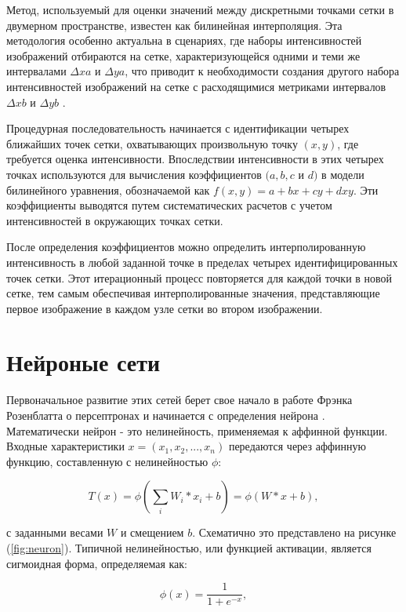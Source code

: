 Метод, используемый для оценки значений между дискретными точками сетки в двумерном пространстве, известен как билинейная интерполяция. Эта методология особенно актуальна в сценариях, где наборы интенсивностей изображений отбираются на сетке, характеризующейся одними и теми же интервалами \(\Delta xa \) и \(\Delta ya\), что приводит к необходимости создания другого набора интенсивностей изображений на сетке с расходящимися метриками интервалов \(\Delta xb\) и \(\Delta yb\) \cite{kirkland2010bilinear}.

Процедурная последовательность начинается с идентификации четырех ближайших точек сетки, охватывающих произвольную точку \((x,y)\), где требуется оценка интенсивности. Впоследствии интенсивности в этих четырех точках используются для вычисления коэффициентов \((a, b, c\) и \(d)\) в модели билинейного уравнения, обозначаемой как \(f(x,y) = a + bx + cy + dxy\). Эти коэффициенты выводятся путем систематических расчетов с учетом интенсивностей в окружающих точках сетки.

После определения коэффициентов можно определить интерполированную интенсивность в любой заданной точке в пределах четырех идентифицированных точек сетки. Этот итерационный процесс повторяется для каждой точки в новой сетке, тем самым обеспечивая интерполированные значения, представляющие первое изображение в каждом узле сетки во втором изображении.

\section{Нейроные сети}

Первоначальное развитие этих сетей берет свое начало в работе Фрэнка Розенблатта о персептронах и начинается с определения нейрона \cite{DOU2023484}. Математически нейрон - это нелинейность, применяемая к аффинной функции. Входные характеристики \(x = (x_1, x_2, . . . , x_n)\) передаются через аффинную функцию, составленную с нелинейностью \(\phi\):

\begin{equation}
    T(x) = \phi\left(\sum_{i} W_{i} \ast x_{i} + b\right) = \phi(W \ast x + b)
, \end{equation}

с заданными весами \(W\) и смещением \(b\). Схематично это представлено на рисунке (\ref{fig:neuron}). Типичной нелинейностью, или функцией активации, является сигмоидная форма, определяемая как:

\begin{equation}
    \phi(x) = \frac{1}{1 + e^{-x}}
, \end{equation}

